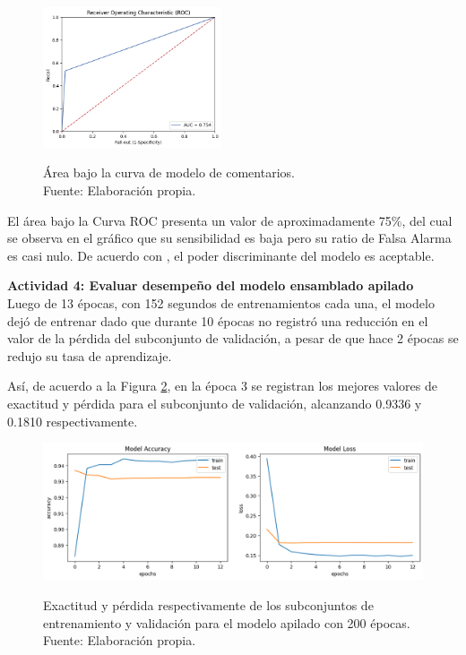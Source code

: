 \begin{figure}[!ht]
	\begin{center}
		\includegraphics[width=0.47\textwidth]{5/figures/comments_auc.png}
		\caption[Área bajo la curva de modelo de comentarios]{Área bajo la curva de modelo de comentarios.\\
		Fuente: Elaboración propia.}
		\vspace{-0.5cm}
		\label{5:fig9}
	\end{center}
\end{figure}

El área bajo la Curva ROC presenta un valor de aproximadamente 75\%, del cual se observa en el gráfico que su sensibilidad es baja pero su ratio de Falsa Alarma es casi nulo. De acuerdo con \cite{bk_britos2006datamining}, el poder discriminante del modelo es aceptable.

\vspace{0.5cm}
\textbf{Actividad 4: Evaluar desempeño del modelo ensamblado apilado}
\\
Luego de 13 épocas, con 152 segundos de entrenamientos cada una, el modelo dejó de entrenar dado que durante 10 épocas no registró una reducción en el valor de la pérdida del subconjunto de validación, a pesar de que hace 2 épocas se redujo su tasa de aprendizaje.

Así, de acuerdo a la Figura \ref{5:fig10}, en la época 3 se registran los mejores valores de exactitud y pérdida para el subconjunto de validación, alcanzando 0.9336 y 0.1810 respectivamente.

\begin{figure}[!ht]
	\begin{center}
		\includegraphics[width=1\textwidth]{5/figures/stacked_model_acc_loss.png}
		\caption[Exactitud y pérdida respectivamente de los subconjuntos de entrenamiento y validación para el modelo apilado con 200 épocas]{Exactitud y pérdida respectivamente de los subconjuntos de entrenamiento y validación para el modelo apilado con 200 épocas.\\
		Fuente: Elaboración propia.}
		\vspace{-0.5cm}
		\label{5:fig10}
	\end{center}
\end{figure}

